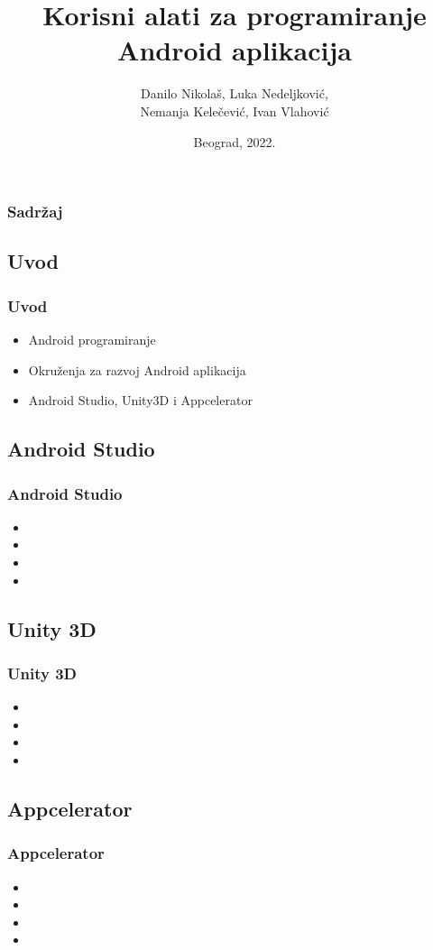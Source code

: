 \documentclass{beamer}
\title{Korisni alati za programiranje Android aplikacija}
\author{Danilo Nikolaš, Luka Nedeljković,\\ Nemanja Kelečević, Ivan Vlahović}
\institute[]{Matematički fakultet, Univerzitet u Beogradu}
\date{
	\footnotesize{Beograd, 2022.}	
}
\begin{document}
\begin{frame}
	\titlepage
\end{frame}


\begin{frame}
	\frametitle{Sadržaj}
	\tableofcontents[hidesubsections] 
\end{frame}

\begin{frame}
    \section{Uvod}
    \frametitle{Uvod} 
    \begin{itemize}
	\item Android programiranje
	\item Okruženja za razvoj Android aplikacija
	\item Android Studio, Unity3D i Appcelerator
   \end{itemize}
\end{frame}

\begin{frame}
    \section{Android Studio}
    \frametitle{Android Studio} 
    \begin{itemize}
	\item
	\item 
	\item 
	\item  
   \end{itemize}
\end{frame}

\begin{frame}
    \section{Unity 3D}
    \frametitle{Unity 3D} 
    \begin{itemize}
	\item
	\item 
	\item 
	\item  
   \end{itemize}
\end{frame}

\begin{frame}
    \section{Appcelerator}
    \frametitle{Appcelerator} 
    \begin{itemize}
	\item
	\item 
	\item 
	\item  
   \end{itemize}
\end{frame}
\end{document}
